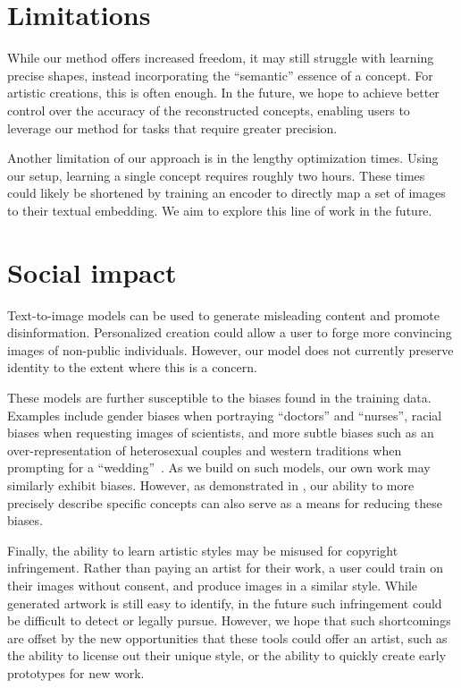 \section{Limitations}
While our method offers increased freedom, it may still struggle with learning precise shapes, instead incorporating the ``semantic'' essence of a concept. For artistic creations, this is often enough. In the future, we hope to achieve better control over the accuracy of the reconstructed concepts, enabling users to leverage our method for tasks that require greater precision.

Another limitation of our approach is in the lengthy optimization times. Using our setup, learning a single concept requires roughly two hours. These times could likely be shortened by training an encoder to directly map a set of images to their textual embedding. We aim to explore this line of work in the future.

\section{Social impact}
Text-to-image models can be used to generate misleading content and promote disinformation. Personalized creation could allow a user to forge more convincing images of non-public individuals. However, our model does not currently preserve identity to the extent where this is a concern.

These models are further susceptible to the biases found in the training data. Examples include gender biases when portraying ``doctors'' and ``nurses'', racial biases when requesting images of scientists, and more subtle biases such as an over-representation of heterosexual couples and western traditions when prompting for a ``wedding''~\citep{mishkin2022risks}. As we build on such models, our own work may similarly exhibit biases. However, as demonstrated in , our ability to more precisely describe specific concepts can also serve as a means for reducing these biases.

Finally, the ability to learn artistic styles may be misused for copyright infringement. Rather than paying an artist for their work, a user could train on their images without consent, and produce images in a similar style. While generated artwork is still easy to identify, in the future such infringement could be difficult to detect or legally pursue. However, we hope that such shortcomings are offset by the new opportunities that these tools could offer an artist, such as the ability to license out their unique style, or the ability to quickly create early prototypes for new work.


